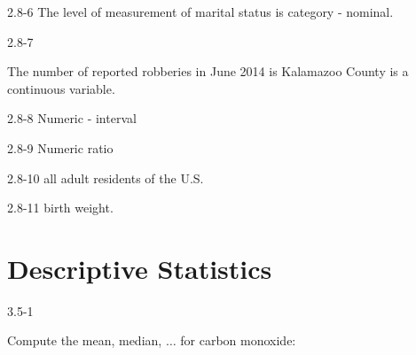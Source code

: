 \begin{exsol@solution}{2.8-6}
	  The level of measurement of marital status is category - nominal.
\end{exsol@solution}
\begin{exsol@solution}{2.8-7}
	
	  The number of reported robberies in June 2014 is Kalamazoo County is a continuous variable.
	
\end{exsol@solution}
\begin{exsol@solution}{2.8-8}
    Numeric - interval

\end{exsol@solution}
\begin{exsol@solution}{2.8-9}
    Numeric  ratio

\end{exsol@solution}
\begin{exsol@solution}{2.8-10}
    all adult residents of the U.S.
\end{exsol@solution}
\begin{exsol@solution}{2.8-11}
    birth weight.
\end{exsol@solution}
\setcounter{chapter}{2}\chapter{Descriptive Statistics}
\begin{exsol@solution}{3.5-1}

	Compute the mean, median, $\dots$ for carbon monoxide:
\end{exsol@solution}
